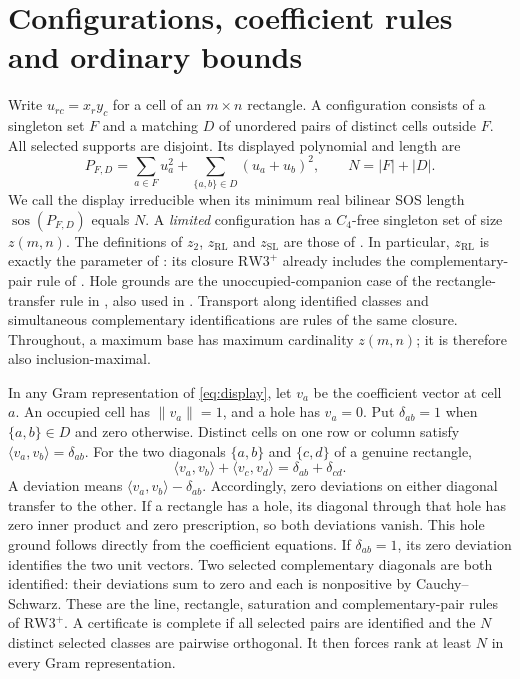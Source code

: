 \documentclass[11pt,a4paper]{article}
\theoremstyle{definition}
\newcommand{\zr}{z_{\mathrm{RL}}}
\newcommand{\zs}{z_{\mathrm{SL}}}
\newcommand{\zt}{z_2}
\newcommand{\sos}{\operatorname{sos}}
\newcommand{\RW}{\mathrm{RW3}^{+}}
\newcommand{\dd}{\delta}
\begin{document}
\section{Configurations, coefficient rules and ordinary bounds}
\label{sec:prelim}

Write $u_{rc}=x_ry_c$ for a cell of an $m\times n$ rectangle.
A configuration consists of a singleton set $F$ and a matching $D$ of
unordered pairs of distinct cells outside $F$. All selected supports are
disjoint. Its displayed polynomial and length are
\begin{equation}\label{eq:display}
 P_{F,D}=\sum_{a\in F}u_a^2+
            \sum_{\{a,b\}\in D}(u_a+u_b)^2,
 \qquad N=|F|+|D|.
\end{equation}
We call the display irreducible when its minimum real bilinear SOS
length $\sos(P_{F,D})$ equals $N$. A \emph{limited} configuration has a
$C_4$-free singleton set of size $z(m,n)$. The definitions of $\zt$,
$\zr$ and $\zs$ are those of \cite[Definitions~3.1, 4.11, 7.3]{LQ}.
In particular, $\zr$ is exactly the parameter of
\cite[Definition~4.11]{LQ}: its closure $\RW$ already includes the
complementary-pair rule of \cite[Definition~4.5]{LQ}. Hole grounds
are the unoccupied-companion case of the rectangle-transfer rule in
\cite[Definition~4.1]{LQ}, also used in \cite[Lemma~4.8]{LQ}.
Transport along identified classes and simultaneous complementary
identifications are rules of the same closure. Throughout, a maximum base
has maximum cardinality $z(m,n)$; it is therefore also inclusion-maximal.

In any Gram representation of \eqref{eq:display}, let $v_a$ be the
coefficient vector at cell $a$. An occupied cell has $\|v_a\|=1$, and a
hole has $v_a=0$. Put $\dd_{ab}=1$ when $\{a,b\}\in D$ and zero
otherwise. Distinct cells on one row or column satisfy
$\langle v_a,v_b\rangle=\dd_{ab}$. For the two diagonals $\{a,b\}$ and
$\{c,d\}$ of a genuine rectangle,
\begin{equation}\label{eq:rectangle}
 \langle v_a,v_b\rangle+\langle v_c,v_d\rangle
       =\dd_{ab}+\dd_{cd}.
\end{equation}
A deviation means $\langle v_a,v_b\rangle-\dd_{ab}$.
Accordingly, zero deviations on either diagonal transfer to the other.
If a rectangle has a hole, its diagonal through that hole has zero
inner product and zero prescription, so both deviations vanish. This
hole ground follows directly from the coefficient equations.
If $\dd_{ab}=1$, its zero deviation identifies the two unit vectors.
Two selected complementary diagonals are both identified: their
deviations sum to zero and each is nonpositive by Cauchy--Schwarz.
These are the line, rectangle, saturation and complementary-pair rules
of $\RW$. A certificate is complete if all selected pairs are identified
and the $N$ distinct selected classes are pairwise orthogonal. It then
forces rank at least $N$ in every Gram representation.
\end{document}
